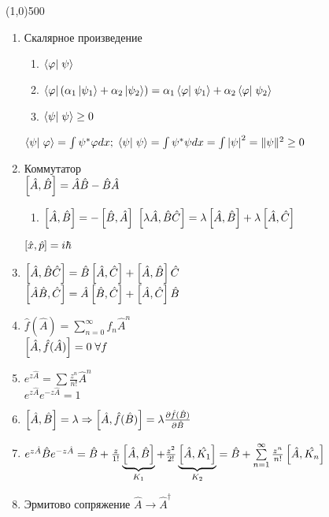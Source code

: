 


\fontsize{20}{24}
\line(1,0){500}
\fontsize{12}{15}
\begin{enumerate}[label=\textbf{\underline{\arabic*.}}]
\item Скалярное произведение
	\begin{enumerate}
	      \item $\braket{\varphi}{\psi}$
            \item $\bra{\varphi}(\alpha_1\ket{\psi_1}+\alpha_2\ket{\psi_2})=\alpha_1\braket{\varphi}{\psi_1}+\alpha_2\braket{\varphi}{\psi_2}$
            \item $\braket{\psi}{\psi}\geq 0$
	\end{enumerate}
      $\braket{\psi}{\varphi}=\int\psi^*\varphi dx;\;\braket{\psi}{\psi}=\int\psi^*\psi dx =\int\abs{\psi}^2=\qnorm{\psi}\geq 0$
\item Коммутатор\\
      $\left[ \hat{A}, \hat{B} \right]=\hat{A}\hat{B}-\hat{B}\hat{A}$
      \begin{enumerate}[label=\textbf{\underline{\alph*.}}]
            \item $ \left[ \hat{A}, \hat{B} \right]=-\left[ \hat{B}, \hat{A} \right] $
            \inlineitem $ \left[ \lambda\hat{A},\hat{B}\hat{C} \right] = \lambda\left[ \hat{A}, \hat{B} \right] + \lambda\left[ \hat{A}, \hat{C} \right] $
      \end{enumerate}
      $\left[ \hat{x}, \hat{p} \right]=i\hbar$
\item $ \left[ \hat{A}, \hat{B}\hat{C} \right] = \hat{B}\left[ \hat{A}, \hat{C} \right] + \left[ \hat{A}, \hat{B} \right]\hat{C} $\\
      $ \left[ \hat{A}\hat{B}, \hat{C} \right] = \hat{A}\left[ \hat{B}, \hat{C} \right] + \left[ \hat{A}, \hat{C} \right]\hat{B} $
\item $ \hat{f}(\hat{A})=\sum\limits_{n=0}^{\infty}f_n \hat{A}^n $\\
      $\left[ \hat{A}, \hat{f}(\hat{A}) \right] = 0\;\forall f $
\item $ e^{z\hat{A}}=\sum \frac{z^n}{n!}\hat{A}^n $ \\
      $ e^{z\hat{A}}e^{-z\hat{A}} = 1 $
\item $ \left[ \hat{A}, \hat{B} \right]=\lambda \Rightarrow \left[ \hat{A}, \hat{f}(\hat{B}) \right]=\lambda \frac{\partial \hat{f}(\hat{B})}{\partial \hat{B}} $
\item $ e^{z\hat{A}}\hat{B}e^{-z\hat{A}} = \hat{B} + \frac{z}{1!}\underbrace{\left[ \hat{A}, \hat{B} \right]}_{K_1} + \frac{z^2}{2!}\underbrace{\left[ \hat{A}, \hat{K_1} \right]}_{K_2} = \hat{B}+\sum\limits_{n=1}^{\infty}\frac{z^n}{n!}\left[ \hat{A}, \hat{K_n} \right] $
\item Эрмитово сопряжение $\hat{A}\rightarrow\hat{A}^\dagger $\\

\end{enumerate}
